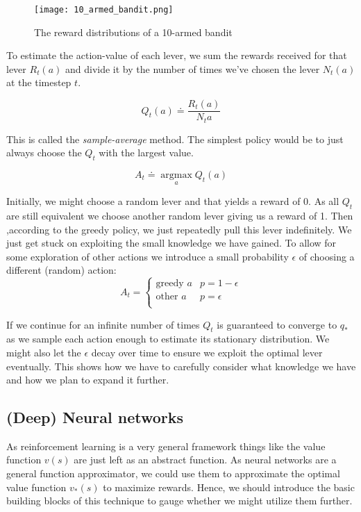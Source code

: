 \begin{figure}
    \centering
    \texttt{[image: 10\_armed\_bandit.png]}
    \caption{The reward distributions of a 10-armed bandit \cite[p.28]{sutton_reinforcement_2018}}
    \label{10_armed_bandit}
\end{figure}

To estimate the action-value of each lever, we sum the rewards received for that lever $ R_t(a) $ and divide it by the number of times we've chosen the lever $ N_t(a) $ at the timestep $ t $.

$$
    Q_t(a) \doteq \frac{R_t(a)}{N_t{a}}
$$

This is called the \textit{sample-average} method. The simplest policy would be to just always choose the $ Q_t $ with the largest value.

$$
    A_t \doteq \operatorname*{argmax}_a Q_t(a)
$$

Initially, we might choose a random lever and that yields a reward of 0. As all $ Q_t $ are still equivalent we choose another random lever giving us a reward of 1. Then ,according to the greedy policy, we just repeatedly pull this lever indefinitely. We just get stuck on exploiting the small knowledge we have gained. To allow for some exploration of other actions we introduce a small probability $\epsilon $ of choosing a different (random) action:
$$
    A_t =
    \begin{cases}
        \text{greedy } a & p = 1 - \epsilon \\
        \text{other } a  & p = \epsilon     \\
    \end{cases}
$$

If we continue for an infinite number of times $ Q_t $ is guaranteed to converge to $ q_{*} $ as we sample each action enough to estimate its stationary distribution. We might also let the $ \epsilon $ decay over time to ensure we exploit the optimal lever eventually. This shows how we have to carefully consider what knowledge we have and how we plan to expand it further.

\subsection{(Deep) Neural networks}
As reinforcement learning is a very general framework things like the value function $ v(s)$ are just left as an abstract function. As neural networks are a general function approximator, we could use them to approximate the optimal value function $ v_{*}(s) $ to maximize rewards. Hence, we should introduce the basic building blocks of this technique to gauge whether we might utilize them further.

